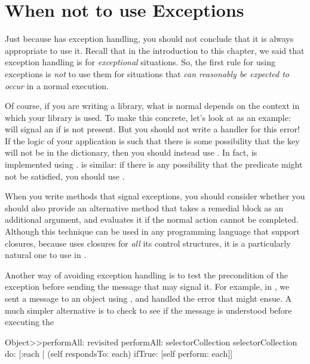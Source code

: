 \documentclass[a4paper,10pt,twoside]{book}
\begin{document}
\section{When not to use Exceptions}
Just because \pharo{} has exception handling, you should not conclude that it is always appropriate to use it.  
Recall that in the introduction to this chapter, we said that exception handling is for \emph{exceptional} situations.  
So, the first rule for using exceptions is \emph{not} to use them for situations that \emph{can reasonably be expected to occur} in a normal execution. 

Of course, if you are writing a library, what is normal depends on the context in which your library is used.
To make this concrete, let's look at  as an example:
 will signal an  if  is not present.
But you should not write a handler for this error!
If the logic of your application is such that there is some possibility that the key will not be in the dictionary, then you should instead use .
In fact,  is implemented using .
 is similar: if there is any possibility that the predicate might not be satisfied, you should use . 

When you write methods that signal exceptions, you should consider whether you should also provide an alternative method that takes a remedial block as an additional argument, and evaluates it if the normal action cannot be completed.  
Although this technique can be used in any programming language that support closures, because \st{} uses closures for \emph{all} its control structures, it is a particularly natural one to use in \st{}.

Another way of avoiding exception handling is to test the precondition of the exception before sending the message that may signal it.  For example, in , we sent a message to an object using , and handled the  error that might ensue.  A much simpler alternative is to check to see if the message is understood before executing the 

\begin{method}[simplerObjectPerfromAll]{Object>>performAll: revisited}
performAll: selectorCollection
	selectorCollection
		do: [:each | (self respondsTo: each)
				ifTrue: [self perform: each]]
\end{method}
\end{document}

